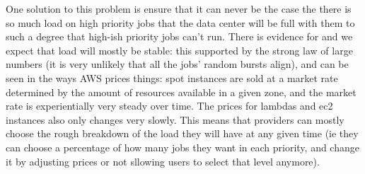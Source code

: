 One solution to this problem is ensure that it can never be the case the there
is so much load on high priority jobs that the data center will be full with
them to such a degree that high-ish priority jobs can't run. There is evidence
for and we expect that load will mostly be stable: this supported by the strong
law of large numbers (it is very unlikely that all the jobs' random  bursts
align), and can be seen in the ways AWS prices things: spot instances are sold
at a market rate determined by the amount of resources available in a given
zone\cite{TODO}, and the market rate is experientially very steady over
time\cite{TODO}. The prices for lambdas and ec2 instances also only changes very
slowly\cite{TODO}. This means that providers can mostly choose the rough
breakdown of the load they will have at any given time (ie they can choose a
percentage of how many jobs they want in each priority, and change it by
adjusting prices or not sllowing users to select that level anymore). 



